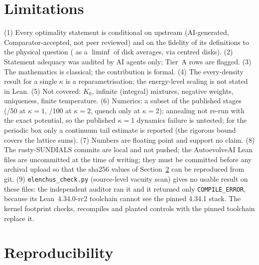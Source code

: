 \documentclass[11pt]{article}
\theoremstyle{remark}
\begin{document}
\section{Limitations}\label{sec:limits}

(1) Every optimality statement is conditional on upstream  (AI-generated,
Comparator-accepted, not peer reviewed) and on the fidelity of its definitions to the physical question
( as a $\liminf$ of disk averages,  via centred disks). (2) Statement adequacy was audited
by AI agents only; \LedgerFlags{} Tier~A rows are flagged. (3) The mathematics is classical; the contribution is
formal. (4) The every-density result for a single $\kappa$ is a reparametrisation; the energy-level scaling is not stated
in Lean. (5) Not covered: $K_0$, infinite (integral) mixtures, negative weights, uniqueness, finite temperature.
(6) Numerics: a subset of the published stages (\NRelaxOne/50 at $\kappa=1$, \NRelaxTwo/100 at $\kappa=2$, quench only
at $\kappa=2$); annealing not re-run with the exact potential, so the published $\kappa=1$ dynamics failure is untested;
for the periodic box only a continuum tail estimate is reported (the rigorous bound covers the lattice sums). (7)
Numbers are floating point and support no claim. (8) The rusty-SUNDIALS commits are local and not pushed; the
AutoevolveAI Lean files are uncommitted at the time of writing; they must be committed before any archival upload so
that the sha256 values of Section~\ref{sec:repro} can be reproduced from git. (9) \texttt{elenchus\_check.py}
(source-level vacuity scan) gives no usable result on these files: the independent auditor ran it and it returned only
\texttt{COMPILE\_ERROR}, because its Lean~4.34.0-rc2 toolchain cannot see the pinned 4.34.1 stack. The kernel
footprint checks, recompiles and planted controls with the pinned toolchain replace it.

\section{Reproducibility}\label{sec:repro}
\end{document}

